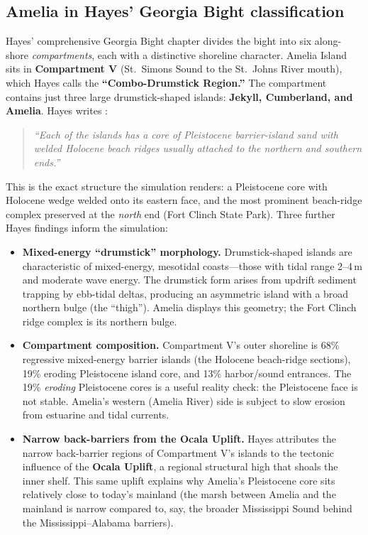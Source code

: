 \documentclass[11pt]{article}
\begin{document}
\subsection{Amelia in Hayes' Georgia Bight classification}

Hayes' comprehensive Georgia Bight chapter \cite{georgiabight} divides the bight
into six along-shore \emph{compartments}, each with a distinctive shoreline
character. Amelia Island sits in \textbf{Compartment V} (St.\ Simons Sound to
the St.\ Johns River mouth), which Hayes calls the
\textbf{``Combo-Drumstick Region.''} The compartment contains just three large
drumstick-shaped islands: \textbf{Jekyll, Cumberland, and Amelia}. Hayes writes
\cite{georgiabight}:

\begin{quote}
\itshape
``Each of the islands has a core of Pleistocene barrier-island sand with welded
Holocene beach ridges usually attached to the northern and southern ends.''
\end{quote}

\noindent This is the exact structure the simulation renders: a Pleistocene
core with Holocene wedge welded onto its eastern face, and the most prominent
beach-ridge complex preserved at the \emph{north} end (Fort Clinch State Park).
Three further Hayes findings inform the simulation:

\begin{itemize}[leftmargin=2em]

\item \textbf{Mixed-energy ``drumstick'' morphology.} Drumstick-shaped islands
are characteristic of mixed-energy, mesotidal coasts---those with tidal range
2--4\,m and moderate wave energy. The drumstick form arises from updrift
sediment trapping by ebb-tidal deltas, producing an asymmetric island with a
broad northern bulge (the ``thigh''). Amelia displays this geometry; the Fort
Clinch ridge complex is its northern bulge.

\item \textbf{Compartment composition.} Compartment V's outer shoreline is
68\% regressive mixed-energy barrier islands (the Holocene beach-ridge
sections), 19\% eroding Pleistocene island core, and 13\% harbor/sound
entrances. The 19\% \emph{eroding} Pleistocene cores is a useful reality
check: the Pleistocene face is not stable. Amelia's western (Amelia River)
side is subject to slow erosion from estuarine and tidal currents.

\item \textbf{Narrow back-barriers from the Ocala Uplift.} Hayes attributes
the narrow back-barrier regions of Compartment V's islands to the tectonic
influence of the \textbf{Ocala Uplift}, a regional structural high that
shoals the inner shelf. This same uplift explains why Amelia's Pleistocene
core sits relatively close to today's mainland (the marsh between Amelia and
the mainland is narrow compared to, say, the broader Mississippi Sound
behind the Mississippi--Alabama barriers).

\end{itemize}
\end{document}
